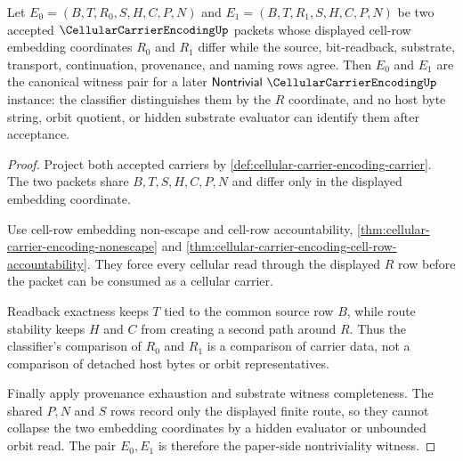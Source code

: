 \begin{theorem}
\label{thm:cellular-carrier-encoding-two-witness-separation}
Let $E_0=(B,T,R_0,S,H,C,P,N)$ and $E_1=(B,T,R_1,S,H,C,P,N)$ be two accepted $\CellularCarrierEncodingUp$ packets whose displayed cell-row embedding coordinates $R_0$ and $R_1$ differ while the source, bit-readback, substrate, transport, continuation, provenance, and naming rows agree. Then $E_0$ and $E_1$ are the canonical witness pair for a later $\mathsf{Nontrivial}\ \CellularCarrierEncodingUp$ instance: the classifier distinguishes them by the $R$ coordinate, and no host byte string, orbit quotient, or hidden substrate evaluator can identify them after acceptance.
\end{theorem}
\begin{proof}
Project both accepted carriers by \autoref{def:cellular-carrier-encoding-carrier}. The two packets share $B,T,S,H,C,P,N$ and differ only in the displayed embedding coordinate.

Use cell-row embedding non-escape and cell-row accountability, \autoref{thm:cellular-carrier-encoding-nonescape} and \autoref{thm:cellular-carrier-encoding-cell-row-accountability}. They force every cellular read through the displayed $R$ row before the packet can be consumed as a cellular carrier.

Readback exactness keeps $T$ tied to the common source row $B$, while route stability keeps $H$ and $C$ from creating a second path around $R$. Thus the classifier's comparison of $R_0$ and $R_1$ is a comparison of carrier data, not a comparison of detached host bytes or orbit representatives.

Finally apply provenance exhaustion and substrate witness completeness. The shared $P,N$ and $S$ rows record only the displayed finite route, so they cannot collapse the two embedding coordinates by a hidden evaluator or unbounded orbit read. The pair $E_0,E_1$ is therefore the paper-side nontriviality witness.
\end{proof}


